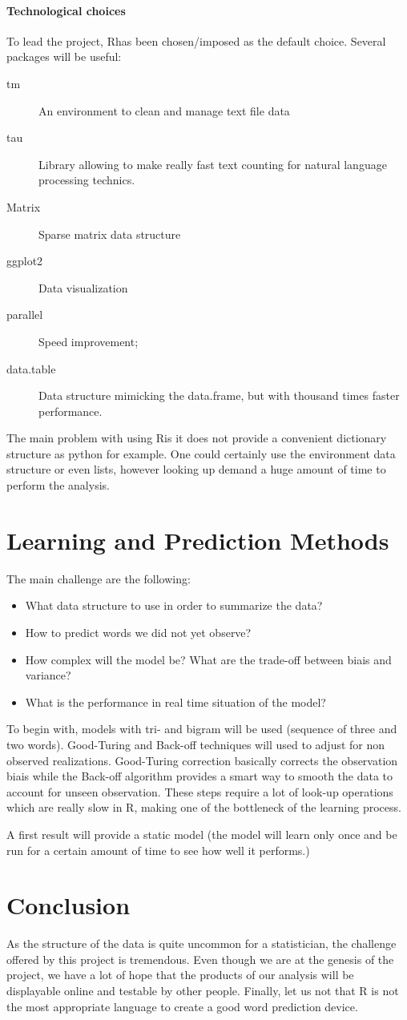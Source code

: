 \documentclass[a4paper]{article}
\newcommand{\R}{\textsf{R}}
\begin{document}
\paragraph{Technological choices}
To lead the project, \R has been chosen/imposed as the default choice. Several
packages will be useful:
\begin{description}
\item[tm] An environment to clean and manage text file data
\item[tau] Library allowing to make really fast text counting for natural
  language processing technics.
\item[Matrix] Sparse matrix data structure
\item[ggplot2] Data visualization
\item[parallel] Speed improvement;
\item[data.table] Data structure mimicking the data.frame, but with thousand
  times faster performance.
\end{description}
The main problem with using \R is it does not provide a convenient dictionary
structure as python for example. One could certainly use the environment data
structure or even lists, however looking up demand a huge amount of time to
perform the analysis.
\section{Learning and Prediction Methods}
The main challenge are the following:
\begin{itemize}
\item What data structure to use in order to summarize the data?
\item How to predict words we did not yet observe?
\item How complex will the model be? What are the trade-off between biais and variance? 
\item What is the performance in real time situation of the model?
\end{itemize}
To begin with, models with tri- and bigram will be used (sequence of three and
two words). Good-Turing and
Back-off techniques will used to adjust for non observed realizations.
Good-Turing correction basically corrects the observation biais while the
Back-off algorithm provides a smart way to smooth the data to account for unseen
observation. These steps require a lot of look-up operations which are really
slow in \R, making one of the bottleneck of the learning process. 

A first result will provide a static model (the model will learn only once and
be run for a certain amount of time to see how well it performs.)

\section{Conclusion}
As the structure of the data is quite uncommon for a statistician, the challenge
offered by this project is tremendous. Even though we are at the genesis of the
project, we have a lot of hope that the products of our analysis will be
displayable online and testable by other people. Finally, let us not that R is
not the most appropriate language to create a good word prediction device.
\end{document}
